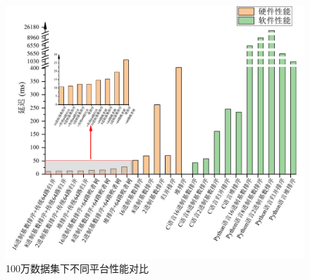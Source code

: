 \begin{figure}[htbp]
    \centering
    \includegraphics[width=\linewidth]{figures/1MComparison.pdf}
    \caption{100万数据集下不同平台性能对比}
    \label{fig:1MComparison}
\end{figure}


\begin{table}[htbp]
\centering
\caption{100万级别数据集软件性能测试}
\label{tab:1Msoftware}
\end{table}



